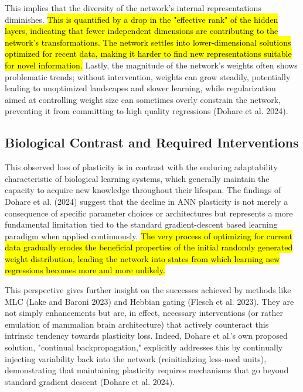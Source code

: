 \documentclass[
10pt, %
a4paper, %
oneside, %
headinclude,footinclude, %
BCOR5mm, %
]{scrartcl}
\begin{document}
This implies that the diversity of the network's internal representations diminishes. \hl{This is quantified by a drop in the "effective rank" of the hidden layers, indicating that fewer independent dimensions are contributing to the network's transformations. The network settles into lower-dimensional solutions optimized for recent data, making it harder to find new representations suitable for novel information. }Lastly, the magnitude of the network's weights often shows problematic trends; without intervention, weights can grow steadily, potentially leading to unoptimized landscapes and slower learning, while regularization aimed at controlling weight size can sometimes overly constrain the network, preventing it from committing to high quality regressions (Dohare et al. 2024).

\subsection{Biological Contrast and Required Interventions}

This observed loss of plasticity is in contrast with the enduring adaptability characteristic of biological learning systems, which generally maintain the capacity to acquire new knowledge throughout their lifespan. The findings of Dohare et al. (2024) suggest that the decline in ANN plasticity is not merely a consequence of specific parameter choices or architectures but represents a more fundamental limitation tied to the standard gradient-descent based learning paradigm when applied continuously. \hl{The very process of optimizing for current data gradually erodes the beneficial properties of the initial randomly generated weight distribution, leading the network into states from which learning new regressions becomes more and more unlikely.} 

This perspective gives further insight on the successes achieved by methods like MLC (Lake and Baroni 2023) and Hebbian gating (Flesch et al. 2023). They are not simply enhancements but are, in effect, necessary interventions (or rather emulation of mammalian brain architecture) that actively counteract this intrinsic tendency towards plasticity loss. Indeed, Dohare et al.'s own proposed solution, "continual backpropagation," explicitly addresses this by continually injecting variability back into the network (reinitializing less-used units), demonstrating that maintaining plasticity requires mechanisms that go beyond standard gradient descent (Dohare et al. 2024).
\end{document}
